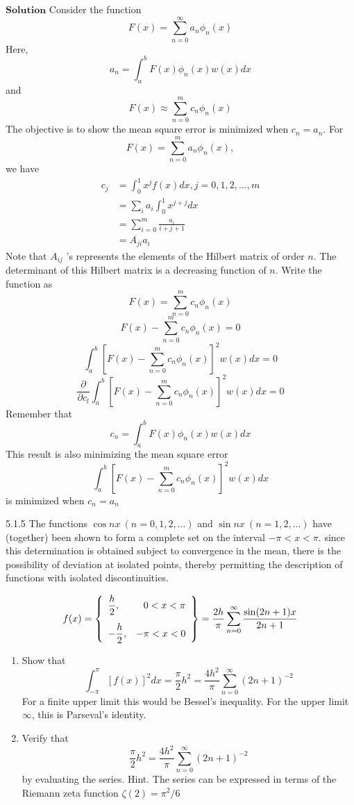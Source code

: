 $\boxed{\textbf{Solution}}$ Consider the function 
$$
F(x)=\sum_{n=0}^{\infty} a_{n} \phi_{n}(x)
$$
Here, $$a_{n}=\int_{a}^{b} F(x) \phi_{n}(x) w(x) d x$$ and $$F(x) \approx \sum_{n=0}^{m} c_{n} \phi_{n}(x)$$
The objective is to show the mean square error is minimized when $c_{n}=a_{n}$.
For $$F(x)=\sum_{n=0}^{m} a_{n} \phi_{n}(x),$$ we have
$$\begin{aligned} c_{j} &=\int_{0}^{1} x^{j} f(x) d x, j=0,1,2, \ldots, m \\ &=\sum_{i} a_{i} \int_{0}^{1} x^{j+j} d x \\ &=\sum_{i=0}^{m} \frac{a_{i}}{i+j+1} \\ &=A_{j i} a_{i} \end{aligned}$$
Note that $A_{i j}$ 's represents the elements of the Hilbert matrix of order $n$.
The determinant of this Hilbert matrix is a decreasing function of $n$.
Write the function as
$$
F(x)=\sum_{n=0}^{m} c_{n} \phi_{n}(x)
$$
$$
F(x)-\sum_{n=0}^{m} c_{n} \phi_{n}(x)=0
$$
$$
\int_{a}^{b}\left[F(x)-\sum_{n=0}^{m} c_{n} \phi_{n}(x)\right]^{2} w(x) d x=0
$$
$$
\frac{\partial}{\partial c_{l}} \int_{a}^{b}\left[F(x)-\sum_{n=0}^{m} c_{n} \phi_{n}(x)\right]^{2} w(x) d x=0
$$
Remember that
$$
c_{n}=\int_{a}^{b} F(x) \phi_{n}(x) w(x) d x
$$
This result is also minimizing the mean square error $$\int_{a}^{b}\left[F(x)-\sum_{n=0}^{m} c_{n} \phi_{n}(x)\right]^{2} w(x) d x$$ is
minimized when $c_{n}=a_{n}$

\newpage

\begin{mybox}{5.1.5}
The functions $\cos n x \ (n=0,1,2, \ldots)$ and $\sin n x \ (n=1,2, \ldots)$ have (together) been shown to form a complete set on the interval $-\pi<x<\pi .$ since this determination is obtained subject to convergence in the mean, there is the possibility of deviation at isolated points, thereby permitting the description of functions with isolated discontinuities.

$$
f(x)=\left\{\begin{array}{lr}
\dfrac{h}{2}, & 0<x<\pi \vspace{3mm}\\
-\dfrac{h}{2}, & -\pi<x<0
\end{array}\right\}=\frac{2 h}{\pi} \sum_{n=0}^{\infty} \frac{\sin (2 n+1) x}{2 n+1}
$$
\begin{enumerate}[$a)$]
\item Show that
$$
\int_{-\pi}^{\pi}[f(x)]^{2} d x=\frac{\pi}{2} h^{2}=\frac{4 h^{2}}{\pi} \sum_{n=0}^{\infty}(2 n+1)^{-2}
$$
For a finite upper limit this would be Bessel's inequality. For the upper limit $\infty$, this is Parseval's identity.
\item Verify that
$$
\frac{\pi}{2} h^{2}=\frac{4 h^{2}}{\pi} \sum_{n=0}^{\infty}(2 n+1)^{-2}
$$
by evaluating the series. Hint. The series can be expressed in terms of the Riemann zeta function $\zeta(2)=\pi^{2} / 6$
\end{enumerate}
\end{mybox}




